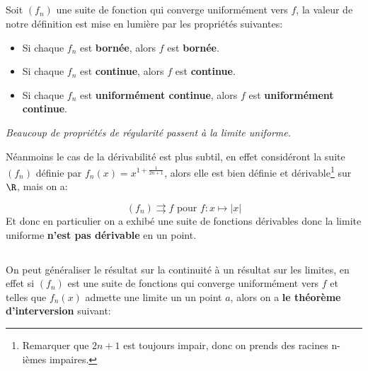 \subsection*{}
Soit \((f_n)\) une suite de fonction qui converge uniformément vers \(f\), la valeur de notre définition est mise en lumière par les propriétés suivantes:
\begin{itemize}
   \item Si chaque \(f_n\) est \textbf{bornée}, alors \(f\) est \textbf{bornée}.
   \item Si chaque \(f_n\) est \textbf{continue}, alors \(f\) est \textbf{continue}.   
   \item Si chaque \(f_n\) est \textbf{uniformément continue}, alors \(f\) est \textbf{uniformément continue}.
\end{itemize}
\begin{center}
   \textit{Beaucoup de propriétés de régularité passent à la limite uniforme.}
\end{center}
Néanmoins le cas de la dérivabilité est plus subtil, en effet considéront la suite \((f_n)\) définie par \(f_n(x) = x^{1+\frac{1}{2n+1}}\), alors elle est bien définie et dérivable\footnote[1]{Remarquer que \(2n+1\) est toujours impair, donc on prends des racines n-ièmes impaires.} sur \(\R\), mais on a:
\begin{center}
\end{center}
\[
   (f_n) \rightrightarrows f \text{ pour } f : x \mapsto |x|
\]
Et donc en particulier on a exhibé une suite de fonctions dérivables donc la limite uniforme \textbf{n'est pas dérivable} en un point.
\subsection*{}
On peut généraliser le résultat sur la continuité à un résultat sur les limites, en effet si \((f_n)\) est une suite de fonctions qui converge uniformément vers \(f\) et telles que \(f_n(x)\) admette une limite un un point \(a\), alors on a \textbf{le théorème d'interversion} suivant:
